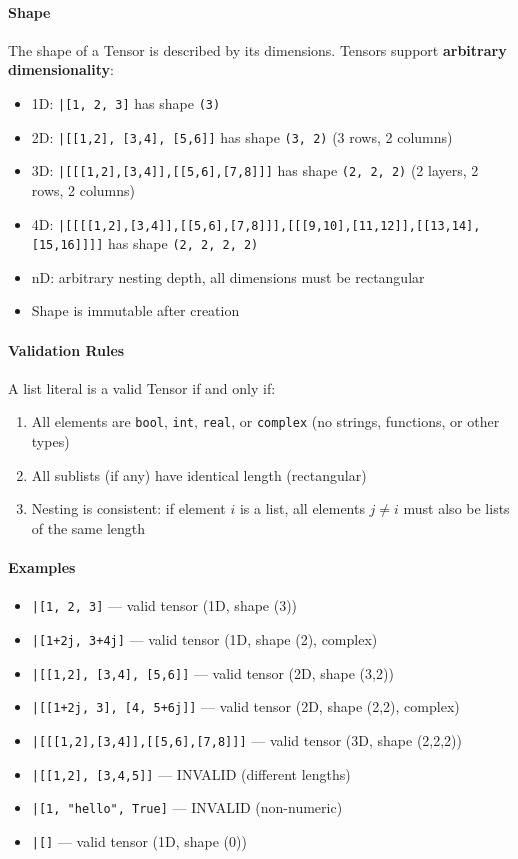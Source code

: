 \paragraph{Shape}
The shape of a Tensor is described by its dimensions. Tensors support \textbf{arbitrary dimensionality}:
\begin{itemize}
\item 1D: \texttt{|[1, 2, 3]} has shape \texttt{(3)}
\item 2D: \texttt{|[[1,2], [3,4], [5,6]]} has shape \texttt{(3, 2)} (3 rows, 2 columns)
\item 3D: \texttt{|[[[1,2],[3,4]],[[5,6],[7,8]]]} has shape \texttt{(2, 2, 2)} (2 layers, 2 rows, 2 columns)
\item 4D: \texttt{|[[[[1,2],[3,4]],[[5,6],[7,8]]],[[[9,10],[11,12]],[[13,14],[15,16]]]]} has shape \texttt{(2, 2, 2, 2)}
\item nD: arbitrary nesting depth, all dimensions must be rectangular
\item Shape is immutable after creation
\end{itemize}

\paragraph{Validation Rules}
A list literal is a valid Tensor if and only if:
\begin{enumerate}
\item All elements are \texttt{bool}, \texttt{int}, \texttt{real}, or \texttt{complex} (no strings, functions, or other types)
\item All sublists (if any) have identical length (rectangular)
\item Nesting is consistent: if element $i$ is a list, all elements $j \neq i$ must also be lists of the same length
\end{enumerate}

\paragraph{Examples}
\begin{itemize}
\item \texttt{|[1, 2, 3]} — valid tensor (1D, shape (3))
\item \texttt{|[1+2j, 3+4j]} — valid tensor (1D, shape (2), complex)
\item \texttt{|[[1,2], [3,4], [5,6]]} — valid tensor (2D, shape (3,2))
\item \texttt{|[[1+2j, 3], [4, 5+6j]]} — valid tensor (2D, shape (2,2), complex)
\item \texttt{|[[[1,2],[3,4]],[[5,6],[7,8]]]} — valid tensor (3D, shape (2,2,2))
\item \texttt{|[[1,2], [3,4,5]]} — INVALID (different lengths)
\item \texttt{|[1, "hello", True]} — INVALID (non-numeric)
\item \texttt{|[]} — valid tensor (1D, shape (0))
\end{itemize}

